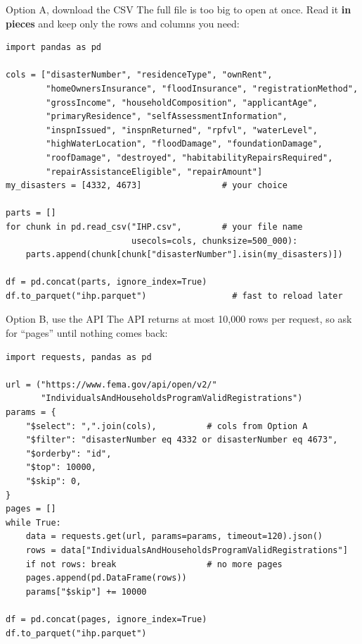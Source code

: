 \documentclass[aspectratio=43,11pt]{beamer}
\begin{document}
\begin{frame}[fragile]{Option A, download the CSV}
  The full file is too big to open at once. Read it \textbf{in pieces}
  and keep only the rows and columns you need:
\begin{lstlisting}
import pandas as pd

cols = ["disasterNumber", "residenceType", "ownRent",
        "homeOwnersInsurance", "floodInsurance", "registrationMethod",
        "grossIncome", "householdComposition", "applicantAge",
        "primaryResidence", "selfAssessmentInformation",
        "inspnIssued", "inspnReturned", "rpfvl", "waterLevel",
        "highWaterLocation", "floodDamage", "foundationDamage",
        "roofDamage", "destroyed", "habitabilityRepairsRequired",
        "repairAssistanceEligible", "repairAmount"]
my_disasters = [4332, 4673]                # your choice

parts = []
for chunk in pd.read_csv("IHP.csv",        # your file name
                         usecols=cols, chunksize=500_000):
    parts.append(chunk[chunk["disasterNumber"].isin(my_disasters)])

df = pd.concat(parts, ignore_index=True)
df.to_parquet("ihp.parquet")                 # fast to reload later
\end{lstlisting}
\end{frame}

\begin{frame}[fragile]{Option B, use the API}
  The API returns at most 10,000 rows per request, so ask for
  ``pages'' until nothing comes back:
\begin{lstlisting}
import requests, pandas as pd

url = ("https://www.fema.gov/api/open/v2/"
       "IndividualsAndHouseholdsProgramValidRegistrations")
params = {
    "$select": ",".join(cols),          # cols from Option A
    "$filter": "disasterNumber eq 4332 or disasterNumber eq 4673",
    "$orderby": "id",
    "$top": 10000,
    "$skip": 0,
}
pages = []
while True:
    data = requests.get(url, params=params, timeout=120).json()
    rows = data["IndividualsAndHouseholdsProgramValidRegistrations"]
    if not rows: break                  # no more pages
    pages.append(pd.DataFrame(rows))
    params["$skip"] += 10000

df = pd.concat(pages, ignore_index=True)
df.to_parquet("ihp.parquet")
\end{lstlisting}
\end{frame}
\end{document}
